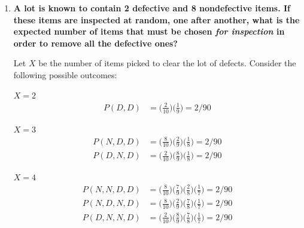 \documentclass[10pt, oneside]{article}
\begin{document}
\begin{enumerate}[label=7.\arabic*]
Let $C_1$ be the cost from the first five attempts. Its expected value is

\[ E[C_1] = \sum^5_{n=1} 10n (0.1)^{n-1} (0.9) \]

Let $C_2$ be the cost for all future attempts. Its expected value is

\[ E[C_2] = \sum_{n=1}^\infty (50 + 5n) (0.1)^{5 + (n-1)} (0.9) \]

The expected cost of the total operation, then, is given by $E[C_1 + C_2]$. Evaluating analytically, one can use the fact that $\sum^m_{n=1} r^n = \frac{r - r^{m+1}}{1-r}$, and differentiate to find that $\sum^m_{n=1} nr^{n-1} = \frac{mr^{m+1} - (m+1) r^m + 1}{(1-r)^2}$. But it is simpler to evaluate numerically, for which we obtain $E[C_1 + C_2] = E[C_1] + E[C_2] = \boxed{\$ 11.11}$.

\item  \begin{tcolorbox}[
  colback=Cerulean!5!white,
  colframe=Cerulean!75!black]
\textbf{A lot is known to contain 2 defective and 8 nondefective items. If these items are inspected at random, one after another, what is the expected number of items that must be chosen \textit{for inspection} in order to remove all the defective ones?}
\end{tcolorbox}

Let $X$ be the number of items picked to clear the lot of defects. Consider the following possible outcomes:

$X = 2$
\begin{align*}
P(D, D) &= \Big( \frac{2}{10} \Big) \Big( \frac{1}{9} \Big) = 2/90 
\end{align*}

$X = 3$
\begin{align*}
P(N,D,D) &= \Big( \frac{8}{10} \Big) \Big( \frac{2}{9} \Big) \Big( \frac{1}{8} \Big) = 2/90 \\
P(D, N, D) &= \Big( \frac{2}{10} \Big) \Big( \frac{8}{9} \Big) \Big( \frac{1}{8} \Big) = 2/90 
\end{align*}

$X = 4$
\begin{align*}
P(N, N, D,D) &= \Big( \frac{8}{10} \Big) \Big( \frac{7}{9} \Big) \Big( \frac{2}{8} \Big) \Big( \frac{1}{7} \Big) = 2/90 \\
P(N, D, N,D) &= \Big( \frac{8}{10} \Big) \Big( \frac{2}{9} \Big) \Big( \frac{7}{8} \Big) \Big( \frac{1}{7} \Big) = 2/90 \\
P(D, N, N,D) &= \Big( \frac{2}{10} \Big) \Big( \frac{8}{9} \Big) \Big( \frac{7}{8} \Big) \Big( \frac{1}{7} \Big) = 2/90 \\
\end{align*}


\end{enumerate}
\end{document}
